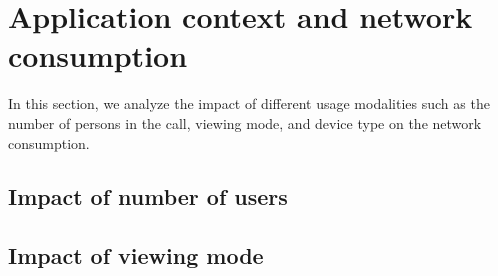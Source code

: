 \section{Application context and network consumption}\label{sec:usage_modality}
In this section, we analyze the impact of different usage modalities such as the number of persons in the call, viewing mode, and device type on the network consumption. 
\subsection{Impact of number of users}
\subsection{Impact of viewing mode}
